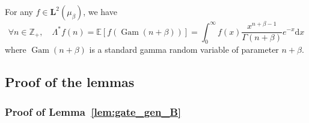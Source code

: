 \documentclass[AHL,Unicode,longabstracts]{cedram}
\DeclareMathOperator{\Gam}{Gam}
\newcommand{\EE}{\mathbb{E}}
\newcommand{\ZZ}{\mathbb{Z}}
\newcommand{\iy}{\infty}
\newcommand{\esL}{\mathbf{L}}
\newcommand{\adjL}{\Lambda^*}
\let\oldforall\forall
\renewcommand*{\forall}{\mathrel{\oldforall}}
\newcommand*{\dd}{\mathrm{d}}
\newcommand*{\dx}{\dd x}
\begin{document}
\begin{lemm}\label{lem:tildeL}
For any $f\in\esL^2(\mu_{\beta})$, we have
\[
\forall n\in\ZZ_+,\quad \adjL f(n)=\EE[f(\Gam(n+\beta))]=\int_0^{\iy} f(x)\frac{x^{n+\beta-1}}{\Gamma(n+\beta)}e^{-x}\dx
\]
where $\Gam(n+\beta)$ is a standard gamma random variable of parameter $n+\beta$.
\end{lemm}

\subsection{Proof of the lemmas}

\subsubsection{Proof of Lemma~\ref{lem:gate_gen_B}}
\end{document}
